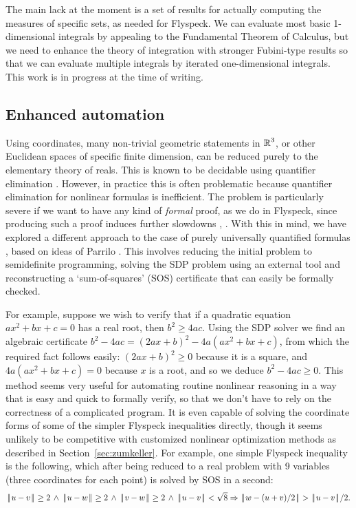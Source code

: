 \documentclass[11pt]{amsart}
\def\|{{\hskip0.1em|\hskip-0.15em|\hskip0.1em}}
\newcommand{\real}{\mbox{$\protect\mathbb R$}}
\let\And=\wedge                    %
\newcommand{\Imp}{\Rightarrow}
\begin{document}
The main lack at the moment is a set of results for actually computing the
measures of specific sets, as needed for Flyspeck. We can evaluate most basic
1-dimensional integrals by appealing to the Fundamental Theorem of Calculus,
but we need to enhance the theory of integration with stronger Fubini-type
results so that we can evaluate multiple integrals by iterated one-dimensional
integrals. This work is in progress at the time of writing.

\subsection{Enhanced automation}

Using coordinates, many non-trivial geometric statements in $\real^3$, or other
Euclidean spaces of specific finite dimension, can be reduced purely to the
elementary theory of reals. This is known to be decidable using quantifier
elimination \cite{tarski-decision,collins,hormander-pdo2}. However, in practice
this is often problematic because quantifier elimination for nonlinear formulas
is inefficient. The problem is particularly severe if we want to have any kind
of {\em formal} proof, as we do in Flyspeck, since producing such a proof
induces further slowdowns \cite{mahboubi-hormander}, \cite{mclaughlin-harrison}. With
this in mind, we have explored a different approach to the case of purely
universally quantified formulas \cite{harrison-sos}, based on ideas of Parrilo
\cite{parrilo-semidefinite}. This involves reducing the initial problem to
semidefinite programming, solving the SDP problem using an external tool and
reconstructing a `sum-of-squares' (SOS) certificate that can easily be formally
checked.

For example, suppose we wish to verify that if a quadratic equation $a x^2 + b
x + c = 0$ has a real root, then $b^2 \geq 4 a c$. Using the SDP solver we find
an algebraic certificate $b^2 - 4 a c = (2 a x + b)^2 - 4 a (a x^2 + b x + c)$,
from which the required fact follows easily: $(2 a x + b)^2 \geq 0$ because it
is a square, and $4 a (a x^2 + b x + c) = 0$ because $x$ is a root, and so we
deduce $b^2 - 4 a c \geq 0$. This method seems very useful for automating
routine nonlinear reasoning in a way that is easy and quick to formally verify,
so that we don't have to rely on the correctness of a complicated program. It
is even capable of solving the coordinate forms of some of the simpler Flyspeck
inequalities directly, though it seems unlikely to be competitive with
customized nonlinear optimization methods as described in Section~\ref{sec:zumkeller}. For
example, one simple Flyspeck inequality is the following, which after being
reduced to a real problem with 9 variables (three coordinates for each point)
is solved by SOS in a second:
$$ \|u - v\| \geq 2 \,\And\, \|u - w\| \geq 2 \,\And\, \|v - w\| \geq 2 \,\And\,
   \|u - v\| < \sqrt{8}
   \Imp \|w - (u + v)/2\| > \|u - v\|/2.
$$
\end{document}

